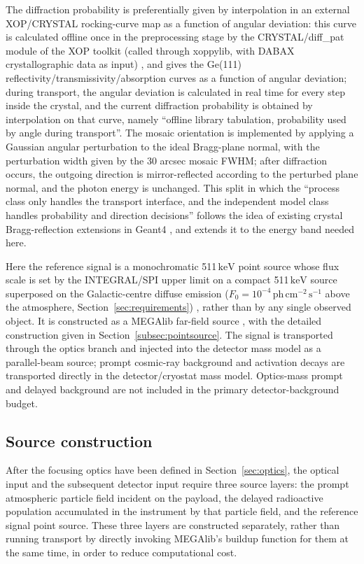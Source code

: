 \documentclass[11pt]{article}
\newcommand{\keV}{\ensuremath{\,\mathrm{keV}}}
\newcommand{\phcms}{\ensuremath{\,\mathrm{ph\,cm^{-2}\,s^{-1}}}}
\newcommand{\fzero}{F_{0}}
\begin{document}
The diffraction probability is preferentially given by interpolation in an external XOP/CRYSTAL rocking-curve map as a function of angular deviation: this curve is calculated offline once in the preprocessing stage by the CRYSTAL/diff\_pat module of the XOP toolkit (called through xoppylib, with DABAX crystallographic data as input) \cite{SanchezDelRio2011XOP}, and gives the Ge(111) reflectivity/transmissivity/absorption curves as a function of angular deviation; during transport, the angular deviation is calculated in real time for every step inside the crystal, and the current diffraction probability is obtained by interpolation on that curve, namely ``offline library tabulation, probability used by angle during transport''. The mosaic orientation is implemented by applying a Gaussian angular perturbation to the ideal Bragg-plane normal, with the perturbation width given by the 30 arcsec mosaic FWHM; after diffraction occurs, the outgoing direction is mirror-reflected according to the perturbed plane normal, and the photon energy is unchanged. This split in which the ``process class only handles the transport interface, and the independent model class handles probability and direction decisions'' follows the idea of existing crystal Bragg-reflection extensions in Geant4 \cite{Guan2023BraggReflection,Reiazi2025G4BraggReflection}, and extends it to the energy band needed here.

Here the reference signal is a monochromatic 511\keV{} point source whose flux scale is set by the INTEGRAL/SPI upper limit on a compact 511\keV{} source superposed on the Galactic-centre diffuse emission ($\fzero=10^{-4}\phcms$ above the atmosphere, Section~\ref{sec:requirements}) \cite{Siegert2016AA,DeCesare2011}, rather than by any single observed object. It is constructed as a MEGAlib far-field source \cite{Zoglauer2006}, with the detailed construction given in Section~\ref{subsec:pointsource}. The signal is transported through the optics branch and injected into the detector mass model as a parallel-beam source; prompt cosmic-ray background and activation decays are transported directly in the detector/cryostat mass model. Optics-mass prompt and delayed background are not included in the primary detector-background budget.

\subsection{Source construction}
\label{sec:background}

After the focusing optics have been defined in Section~\ref{sec:optics}, the
optical input and the subsequent detector input require three source layers: the
prompt atmospheric particle field incident on the payload, the delayed
radioactive population accumulated in the instrument by that particle field, and
the reference signal point source. These three layers are constructed
separately, rather than running transport by directly invoking MEGAlib's buildup
function for them at the same time, in order to reduce computational cost.
\end{document}
